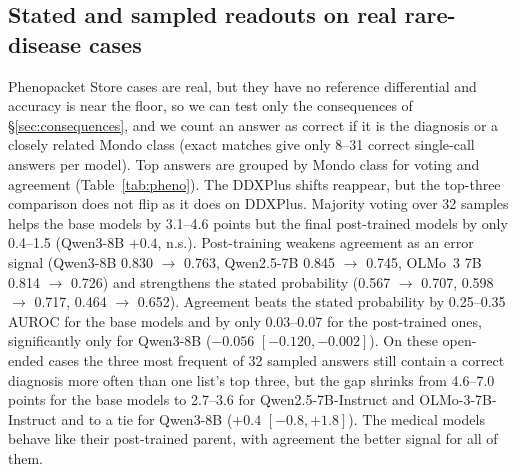 \documentclass[wcp]{jmlr}
\begin{document}
\subsection{Stated and sampled readouts on real rare-disease cases}\label{sec:phenoreadouts}
Phenopacket Store cases are real, but they have no reference differential and accuracy is near the floor, so we can test only the consequences of \S\ref{sec:consequences}, and we count an answer as correct if it is the diagnosis or a closely related Mondo class (exact matches give only 8--31 correct single-call answers per model). Top answers are grouped by Mondo class for voting and agreement (Table~\ref{tab:pheno}).
The DDXPlus shifts reappear, but the top-three comparison does not flip as it does on DDXPlus. Majority voting over 32 samples helps the base models by 3.1--4.6 points but the final post-trained models by only 0.4--1.5 (Qwen3-8B $+0.4$, n.s.). Post-training weakens agreement as an error signal (Qwen3-8B 0.830 $\rightarrow$ 0.763, Qwen2.5-7B 0.845 $\rightarrow$ 0.745, OLMo~3 7B 0.814 $\rightarrow$ 0.726) and strengthens the stated probability (0.567 $\rightarrow$ 0.707, 0.598 $\rightarrow$ 0.717, 0.464 $\rightarrow$ 0.652). Agreement beats the stated probability by 0.25--0.35 AUROC for the base models and by only 0.03--0.07 for the post-trained ones, significantly only for Qwen3-8B ($-0.056$ $[-0.120,-0.002]$). On these open-ended cases the three most frequent of 32 sampled answers still contain a correct diagnosis more often than one list's top three, but the gap shrinks from 4.6--7.0 points for the base models to 2.7--3.6 for Qwen2.5-7B-Instruct and OLMo-3-7B-Instruct and to a tie for Qwen3-8B ($+0.4$ $[-0.8,+1.8]$). The medical models behave like their post-trained parent, with agreement the better signal for all of them.
\end{document}
